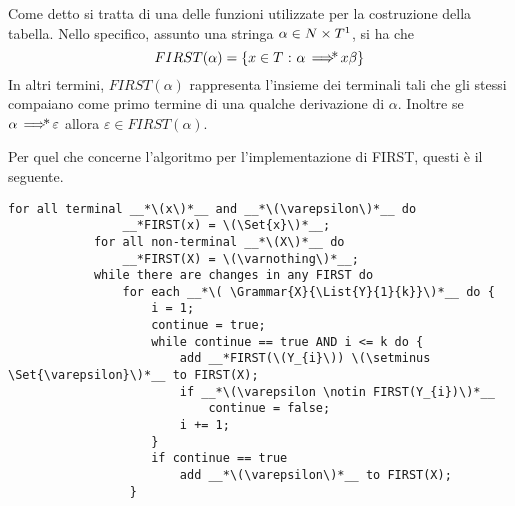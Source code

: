\documentclass{subfiles}
\begin{document}
Come detto si tratta di una delle funzioni utilizzate per la costruzione della tabella.
Nello specifico, assunto una stringa \(\alpha \in N \times T\footnotemark[1]\), si ha che
\[
    FIRST(\alpha) = \Set{x \in T}[\alpha \GrammarDerivation x\beta]
\]
In altri termini, \(FIRST(\alpha)\) rappresenta l'insieme dei terminali tali che gli stessi compaiano come primo termine di una qualche derivazione di \(\alpha\).
Inoltre se \(\alpha \operatorname{\implies\hspace{-7.5pt}*} \varepsilon\) allora \(\varepsilon \in FIRST(\alpha)\).

\begin{Algorithm*}
    Per quel che concerne l'algoritmo per l'implementazione di FIRST, questi è il seguente.
    \begin{center}
        \begin{lstlisting}[language = PSEUDO]
            for all terminal __*\(x\)*__ and __*\(\varepsilon\)*__ do
                __*FIRST(x) = \(\Set{x}\)*__;
            for all non-terminal __*\(X\)*__ do
                __*FIRST(X) = \(\varnothing\)*__;
            while there are changes in any FIRST do
                for each __*\( \Grammar{X}{\List{Y}{1}{k}}\)*__ do {
                    i = 1;
                    continue = true;
                    while continue == true AND i <= k do {
                        add __*FIRST(\(Y_{i}\)) \(\setminus \Set{\varepsilon}\)*__ to FIRST(X);
                        if __*\(\varepsilon \notin FIRST(Y_{i})\)*__
                            continue = false;
                        i += 1;
                    }
                    if continue == true
                        add __*\(\varepsilon\)*__ to FIRST(X);
                 }
        \end{lstlisting}
    \end{center}
\end{Algorithm*}
\end{document}
